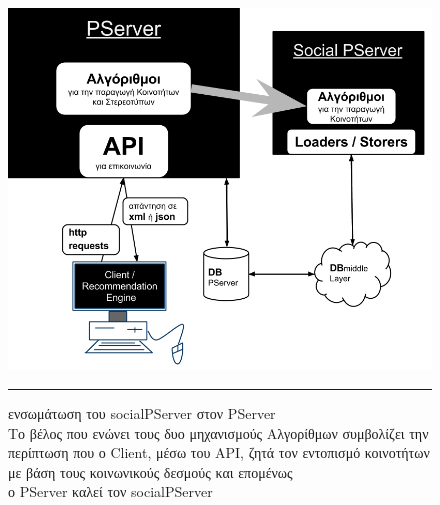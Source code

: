\begin{figure}[htbp]
  \hspace{-8.5em}  
    \includegraphics[scale=0.70]{Figures/socialPServer_PServer_combine.png}
	\rule{35em}{0.5pt}  %
	\caption[PServerArchitecture]{ενσωμάτωση του socialPServer στον PServer\\
	Το βέλος που ενώνει τους δυο μηχανισμούς Αλγορίθμων συμβολίζει την περίπτωση
	που ο Client, μέσω του API, ζητά τον εντοπισμό κοινοτήτων με βάση τους κοινωνικούς δεσμούς
	και επομένως\\ ο PServer καλεί τον socialPServer}
  \label{fig:socialPServer_PServer_combine}  
\end{figure}


